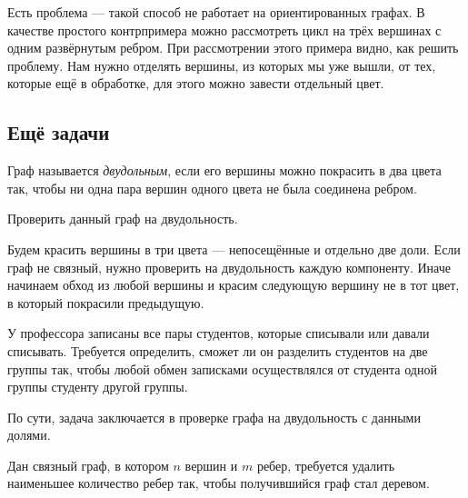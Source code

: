 Есть проблема --- такой способ не работает на ориентированных графах. В качестве простого контрпримера можно рассмотреть цикл на трёх вершинах с одним развёрнутым ребром. При рассмотрении этого примера видно, как решить проблему. Нам нужно отделять вершины, из которых мы уже вышли, от тех, которые ещё в обработке, для этого можно завести отдельный цвет.

\subsection{Ещё задачи}

\begin{definition}
    Граф называется \textit{двудольным}, если его вершины можно покрасить в два цвета так, чтобы ни одна пара вершин одного цвета не была соединена ребром.
\end{definition}

\begin{problem}
    Проверить данный граф на двудольность.
\end{problem}

Будем красить вершины в три цвета --- непосещённые и отдельно две доли. Если граф не связный, нужно проверить на двудольность каждую компоненту. Иначе начинаем обход из любой вершины и красим следующую вершину не в тот цвет, в который покрасили предыдущую.

\begin{problem}
    У профессора записаны все пары студентов, которые списывали или давали списывать. Требуется определить, сможет ли он разделить студентов на две группы так, чтобы любой обмен записками осуществлялся от студента одной группы студенту другой группы.
\end{problem}

По сути, задача заключается в проверке графа на двудольность с данными долями. 

\begin{problem}
    Дан связный граф, в котором $n$ вершин и $m$ ребер, требуется удалить наименьшее количество ребер так, чтобы получившийся граф стал деревом.
\end{problem}
